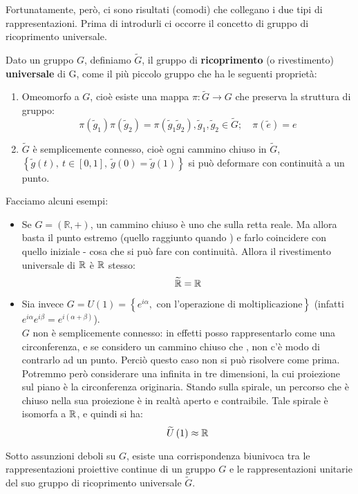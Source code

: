 \documentclass[../../FisicaTeorica.tex]{subfiles}
\begin{document}
Fortunatamente, però, ci sono risultati (comodi) che collegano i due tipi di rappresentazioni. Prima di introdurli ci occorre il concetto di gruppo di ricoprimento universale.
\begin{dfn}
Dato un gruppo $G$, definiamo $\widetilde{G}$, il gruppo di \textbf{ricoprimento} (o rivestimento) \textbf{universale} di G, come il più piccolo gruppo che ha le seguenti proprietà:
\begin{enumerate}
    \item Omeomorfo a $G$, cioè esiste una mappa $\pi :\widetilde{G}\to G$ che preserva la struttura di gruppo:
    \[
	\pi \left({\widetilde{g}}_1\right)\pi \left({\widetilde{g}}_2\right)=\pi \left({\widetilde{g}}_1{\widetilde{g}}_2\right), {\widetilde{g}}_1,{\widetilde{g}}_2\in \widetilde{G}; \quad
	\pi \left(\widetilde{e}\right)=e
	\]
	\item $\widetilde{G}$ è semplicemente connesso, cioè ogni cammino chiuso in $\widetilde{G}$, $\left\{\widetilde{g}\left(t\right),\ t\in\left[0,1\right],\ \widetilde{g}\left(0\right)=\widetilde{g}(1)\right\}$ si può deformare con continuità a un punto.
\end{enumerate}
\end{dfn}
Facciamo alcuni esempi: %
\begin{itemize}
\item Se $G=\left(\mathbb{R},+\right)$, un cammino chiuso è uno che  sulla retta reale. Ma allora basta  il punto estremo (quello raggiunto quando ) e farlo coincidere con quello iniziale - cosa che si può fare con continuità. Allora il rivestimento universale di $\mathbb{R}$ è $\mathbb{R}$ stesso:
\[
\widetilde{\mathbb{R}}=\mathbb{R}
\]
\item Sia invece $G=U\left(1\right)= \left\{e^{i\alpha},\text{ con l'operazione di moltiplicazione}\right\}$ (infatti $e^{i\alpha}e^{i\beta}=e^{i\left(\alpha+\beta\right)}$).\\
$G$ non è semplicemente connesso: in effetti posso rappresentarlo come una circonferenza, e se considero un cammino chiuso che , non c'è modo di contrarlo ad un punto. Perciò questo caso non si può risolvere come prima.\\
Potremmo però considerare una  infinita in tre dimensioni, la cui proiezione sul piano è la circonferenza originaria. Stando sulla spirale, un percorso che è chiuso nella sua proiezione è in realtà aperto e contraibile. Tale spirale è isomorfa a $\mathbb{R}$, e quindi si ha:
\[\widetilde{U}\left(1\right)\approx \mathbb{R}
\]
\end{itemize}
\begin{thm}
Sotto assunzioni deboli su $G$, esiste una corrispondenza biunivoca tra le rappresentazioni proiettive continue di un gruppo $G$ e le rappresentazioni unitarie del suo gruppo di ricoprimento universale $\widetilde{G}$.
\end{thm}
\end{document}
